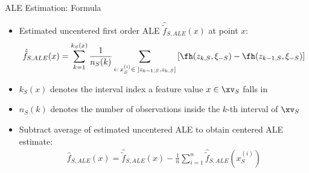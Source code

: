 \documentclass[11pt,compress,t,notes=noshow, aspectratio=169, xcolor=table]{beamer}
\begin{document}
%
%
%
%
%
%
%
%
%
%
%
%
%
%

\begin{frame}{ALE Estimation: Formula}

\begin{itemize}
\item Estimated uncentered first order ALE $\hat{\tilde{f}}_{S, ALE}(x)$ at point $x$:
$$
\begin{aligned}
\hat{\tilde{f}}_{S, ALE}(x) = \sum_{k = 1}^{k_S(x)}\frac{1}{n_S(k)}\sum_{i: \; x_S^{(i)} \in \; ]z_{k-1, S}, z_{k, S}]}\left[\fh(z_{k, S}, \xi_{-S}) -\fh(z_{k-1, S}, \xi_{-S})\right]
\end{aligned}
$$
\item $k_S(x)$ denotes the interval index a feature value $x \in \xv_S$ falls in
\item $n_S(k)$ denotes the number of observations inside the $k$-th interval of $\xv_S$
\item Subtract average of estimated uncentered ALE to obtain centered ALE estimate: %
$$
\begin{aligned}
\hat{f}_{S, ALE}(x) = \hat{\tilde{f}}_{S, ALE}(x) - \frac{1}{n}\sum_{i = 1}^n \hat{\tilde{f}}_{S, ALE}(x_S^{(i)})
\end{aligned}
$$

\end{itemize}
\end{frame}
\end{document}

